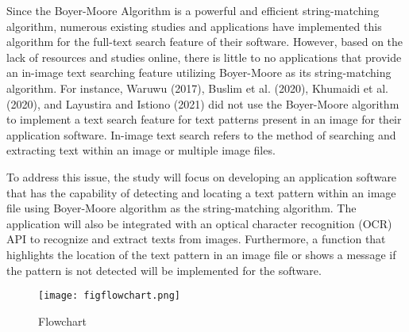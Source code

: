 \hfill

Since the Boyer-Moore Algorithm is a powerful and efficient string-matching algorithm, numerous existing studies and applications have implemented this algorithm for the full-text search feature of their software. However, based on the lack of resources and studies online, there is little to no applications that provide an in-image text searching feature utilizing Boyer-Moore as its string-matching algorithm. For instance, Waruwu (2017), Buslim et al. (2020), Khumaidi et al. (2020), and Layustira and Istiono (2021) did not use the Boyer-Moore algorithm to implement a text search feature for text patterns present in an image for their application software. In-image text search refers to the method of searching and extracting text within an image or multiple image files.

\hfill

To address this issue, the study will focus on developing an application software that has the capability of detecting and locating a text pattern within an image file using Boyer-Moore algorithm as the string-matching algorithm. The application will also be integrated with an optical character recognition (OCR) API to recognize and extract texts from images. Furthermore, a function that highlights the location of the text pattern in an image file or shows a message if the pattern is not detected will be implemented for the software.

\begin{figure}[hbt!]
   \center
   \noindent\texttt{[image: figflowchart.png]}
   \caption{Flowchart}
   \label{fig:flowchart}
\end{figure}
